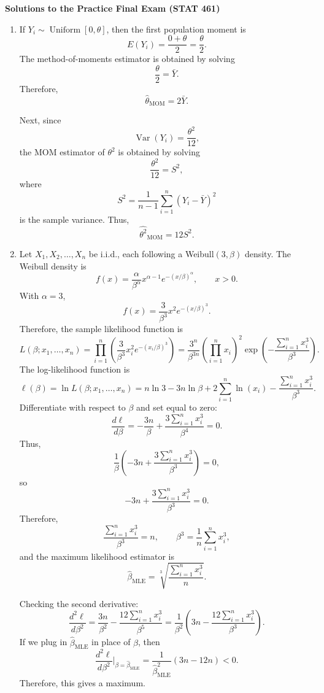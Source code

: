 \documentclass[11pt]{article}
\begin{document}
\begin{center}
    {\Large \textbf{Solutions to the Practice Final Exam (STAT 461)}}
\end{center}

\begin{enumerate}[label=\textbf{(\arabic*)}, start=9, leftmargin=*]

\item If $Y_i \sim \operatorname{Uniform}[0,\theta]$, then the first population moment is
\[
E(Y_i)=\frac{0+\theta}{2}=\frac{\theta}{2}.
\]
The method-of-moments estimator is obtained by solving
\[
\frac{\theta}{2}=\bar{Y}.
\]
Therefore,
\[
\widehat{\theta}_{\mathrm{MOM}}=2\bar{Y}.
\]

Next, since
\[
\operatorname{Var}(Y_i)=\frac{\theta^2}{12},
\]
the MOM estimator of $\theta^2$ is obtained by solving
\[
\frac{\theta^2}{12}=S^2,
\]
where
\[
S^2=\frac{1}{n-1}\sum_{i=1}^{n}(Y_i-\bar{Y})^2
\]
is the sample variance. Thus,
\[
\widehat{\theta^2}_{\mathrm{MOM}}=12S^2.
\]

\item Let $X_1,X_2,\ldots,X_n$ be i.i.d., each following a Weibull$(3,\beta)$ density. The Weibull density is
\[
f(x)=\frac{\alpha}{\beta^\alpha}x^{\alpha-1}e^{-(x/\beta)^\alpha}, \qquad x>0.
\]
With $\alpha=3$,
\[
f(x)=\frac{3}{\beta^3}x^2e^{-(x/\beta)^3}.
\]
Therefore, the sample likelihood function is
\[
L(\beta;x_1,\ldots,x_n)
=\prod_{i=1}^{n}\left(\frac{3}{\beta^3}x_i^2e^{-(x_i/\beta)^3}\right)
=\frac{3^n}{\beta^{3n}}\left(\prod_{i=1}^{n}x_i\right)^2
\exp\left(-\frac{\sum_{i=1}^{n}x_i^3}{\beta^3}\right).
\]
The log-likelihood function is
\[
\ell(\beta)
=\ln L(\beta;x_1,\ldots,x_n)
=n\ln 3-3n\ln \beta+2\sum_{i=1}^{n}\ln(x_i)-\frac{\sum_{i=1}^{n}x_i^3}{\beta^3}.
\]
Differentiate with respect to $\beta$ and set equal to zero:
\[
\frac{d\ell}{d\beta}
=-\frac{3n}{\beta}+\frac{3\sum_{i=1}^{n}x_i^3}{\beta^4}=0.
\]
Thus,
\[
\frac{1}{\beta}\left(-3n+\frac{3\sum_{i=1}^{n}x_i^3}{\beta^3}\right)=0,
\]
so
\[
-3n+\frac{3\sum_{i=1}^{n}x_i^3}{\beta^3}=0.
\]
Therefore,
\[
\frac{\sum_{i=1}^{n}x_i^3}{\beta^3}=n,
\qquad
\beta^3=\frac{1}{n}\sum_{i=1}^{n}x_i^3,
\]
and the maximum likelihood estimator is
\[
\widehat{\beta}_{\mathrm{MLE}}
=\sqrt[3]{\frac{\sum_{i=1}^{n}x_i^3}{n}}.
\]

Checking the second derivative:
\[
\frac{d^2\ell}{d\beta^2}
=\frac{3n}{\beta^2}-\frac{12\sum_{i=1}^{n}x_i^3}{\beta^5}
=\frac{1}{\beta^2}\left(3n-\frac{12\sum_{i=1}^{n}x_i^3}{\beta^3}\right).
\]
If we plug in $\widehat{\beta}_{\mathrm{MLE}}$ in place of $\beta$, then
\[
\frac{d^2\ell}{d\beta^2}\bigg|_{\beta=\widehat{\beta}_{\mathrm{MLE}}}
=\frac{1}{\widehat{\beta}_{\mathrm{MLE}}^2}(3n-12n)<0.
\]
Therefore, this gives a maximum.


\end{enumerate}
\end{document}
